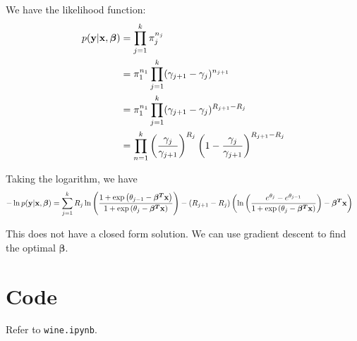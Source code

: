 \documentclass[reqno]{amsart}
\begin{document}
    We have the likelihood function:
    \begin{align}
        \begin{split}
            p(\mathbf{y}|\mathbf{x}, \boldsymbol{\beta}) &= \prod_{j = 1}^{k} \pi_j^{n_j} \\
            &= \pi_1^{n_1} \prod_{j = 1}^{k} (\gamma_{j + 1} - \gamma_j)^{n_{j + 1}} \\
            &= \pi_1^{n_1} \prod_{j = 1}^{k} (\gamma_{j + 1} - \gamma_j)^{R_{j + 1} - R_j}  \\
            &= \prod_{n = 1}^{k} \left(\frac{\gamma_j}{\gamma_{j + 1}}\right)^{R_j} \left(1 - \frac{\gamma_j}{\gamma_{j + 1}}\right)^{R_{j + 1} - R_j} \\
        \end{split}
    \end{align}

    Taking the logarithm, we have
    \begin{align}
        \begin{split}
            -\ln p(\mathbf{y}|\mathbf{x}, \boldsymbol{\beta}) &= 
            \sum_{j = 1}^{k} R_j \ln \left(\frac{1 + \exp \left(\theta_{j - 1} - \boldsymbol{\beta^T}\mathbf{x}\right)}{1 + \exp \left(\theta_j - \boldsymbol{\beta^T}\mathbf{x}\right)}\right) - (R_{j + 1} - R_j) \left(\ln \left(\frac{e^{\theta_j} - e^{\theta_{j - 1}}}{1 + \exp \left(\theta_j - \boldsymbol{\beta^T}\mathbf{x}\right)}\right) - \boldsymbol{\beta^T}\mathbf{x}\right)
        \end{split}
    \end{align}

    This does not have a closed form solution. We can use gradient descent to find the optimal \(\boldsymbol{\beta}\).

    \section{Code}

    Refer to \texttt{wine.ipynb}.
\end{document}
